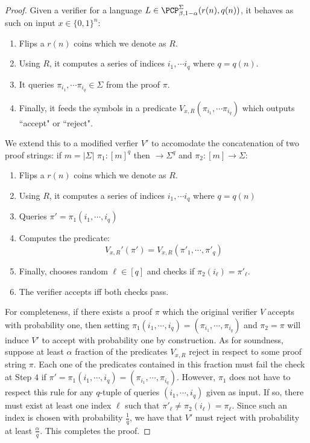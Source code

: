 \begin{proof}
Given a verifier for a language $L \in \PCP^\Sigma_{\beta, 1 - \alpha}(r(n),q(n))$, it behaves as such on input $x \in \{0,1\}^n$:
%
\begin{enumerate}
  \item Flips a $r(n)$ coins which we denote as $R$.
  \item Using $R$, it computes a series of indices $i_1, \cdots i_q$ where $q = q(n)$.
  \item It queries $\pi_{i_1}, \cdots \pi_{i_q}\in \Sigma$ from the proof $\pi$.
  \item Finally, it feeds the symbols in a predicate $V_{x,R}(\pi_{i_1}, \cdots \pi_{i_q})$ which outputs ``accept" or ``reject".
\end{enumerate}
We extend this to a modified verfier $V'$ to accomodate the concatenation of two proof strings: if $m = |\Sigma|$ $\pi_1:[m]^q$ then $\rightarrow \Sigma^{q}$ and $\pi_2:[m]\rightarrow \Sigma$:
%
\begin{enumerate}
  \item Flips a $r(n)$ coins which we denote as $R$.
  \item Using $R$, it computes a series of indices $i_1, \cdots i_q$ where $q = q(n)$
  \item Queries $\pi' = \pi_1(i_1, \cdots, i_q)$
  \item Computes the predicate:
  \[ V_{x,R}'(\pi') = V_{x,R}(\pi'_1,\cdots,\pi'_q) \]
  \item Finally, chooses random $\ell \in [q]$ and checks if $\pi_2(i_\ell) = \pi'_\ell$.
  \item The verifier accepts iff both checks pass.
\end{enumerate}

For completeness, if there exists a proof $\pi$ which the original verifier $V$ accepts with probability one, then setting $\pi_1(i_1, \cdots, i_q) = (\pi_{i_1},\cdots,\pi_{i_q})$ and $\pi_2 = \pi$ will induce $V'$ to accept with probability one by construction.
%
As for soundness, suppose  at least $\alpha$ fraction of the predicates $V_{x,R}$ reject in respect to some proof string $\pi$. Each one of the predicates contained in this fraction must fail the check at Step $4$ if $\pi' = \pi_1(i_1, \cdots, i_q) = (\pi_{i_1},\cdots,\pi_{i_q})$. However, $\pi_1$ does not have to respect this rule for any $q$-tuple of queries $(i_1, \cdots, i_q)$ given as input. If so, there must exist at least one index $\ell$ such that $\pi'_\ell \neq \pi_2(i_\ell) = \pi_\ell$. Since such an index is chosen with probability $\frac{1}{q}$, we have that $V'$ must reject with probability at least $\frac{\alpha}{q}$. This completes the proof. 
\end{proof}


